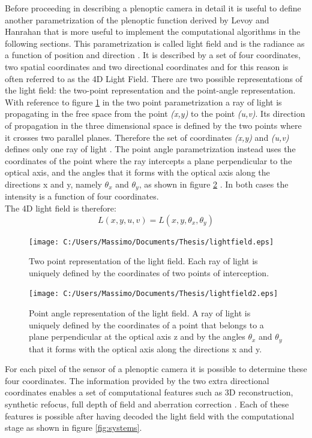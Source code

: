 Before proceeding in describing a plenoptic camera in detail it is useful to define another parametrization of the plenoptic function derived by Levoy and Hanrahan \cite{levoy1996light} that is more useful to implement the computational algorithms in the following sections. This parametrization is called light field and is the radiance as a function of position and direction \cite{levoy1996light}. It is described by a set of four coordinates, two spatial coordinates and two directional coordinates and for this reason is often referred to as the 4D Light Field. There are two possible representations of the light field: the two-point representation and the point-angle representation. With reference to figure \ref{fig:lightfield} in the two point parametrization a ray of light is propagating in the free space from the point \textit{(x,y)} to the point\textit{ (u,v)}. Its direction of propagation in the three dimensional space is defined by the two points where it crosses two parallel planes. Therefore the set of coordinates \textit{(x,y)} and \textit{(u,v)} defines only one ray of light \cite{levoy1996light}. The point angle parametrization instead uses the coordinates of the point where the ray intercepts a plane perpendicular to the optical axis, and the angles that it forms with the optical axis along the directions x and y, namely $\theta_x$  and $\theta_y$, as shown in figure \ref{fig:lightfield2} \cite{georgiev2006light}. In both cases the intensity is a function of four coordinates. \\ The 4D light field is therefore:
\begin{equation}
\label{eq:lightfield}
L(x,y,u,v) = L(x,y,\theta_x,\theta_y)
\end{equation}
\begin{figure}[H]
	\centering
	\texttt{[image: C:/Users/Massimo/Documents/Thesis/lightfield.eps]}
	\caption{\label{fig:lightfield}Two point representation of the light field. Each ray of light is uniquely defined by the coordinates of two points of interception.}
\end{figure}
\begin{figure}[H]
	\centering
	\texttt{[image: C:/Users/Massimo/Documents/Thesis/lightfield2.eps]}
	\caption{\label{fig:lightfield2}Point angle representation of the light field. A ray of light is uniquely defined by the coordinates of a point that belongs to a plane perpendicular at the optical axis z and by the angles $\theta_x$ and $\theta_y$ that it forms with the optical axis along the directions x and y.}
\end{figure}
For each pixel of the sensor of a plenoptic camera it is possible to determine these four coordinates. The information provided by the two extra directional coordinates enables a set of computational features such as 3D reconstruction, synthetic refocus, full depth of field and aberration correction \cite{ng2006digital}. Each of these features is possible after having decoded the light field with the computational stage as shown in figure \ref{fig:systems}.
